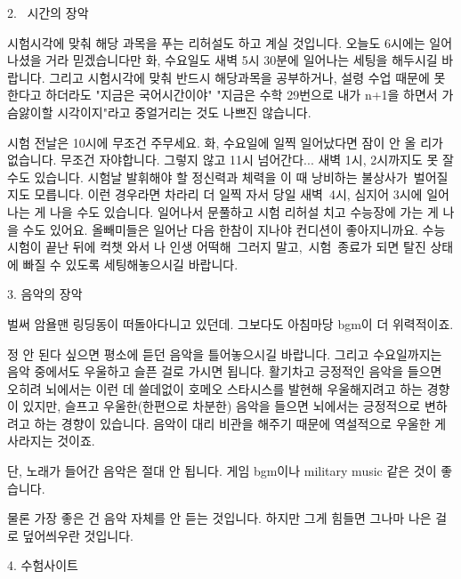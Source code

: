 \item 2.  시간의 장악
\vspace{5mm}

시험시각에 맞춰 해당 과목을 푸는 리허설도 하고 계실 것입니다.
오늘도 6시에는 일어나셨을 거라 믿겠습니다만 화, 수요일도 새벽 5시 30분에 일어나는 세팅을 해두시길 바랍니다.
그리고 시험시각에 맞춰 반드시 해당과목을 공부하거나, 설령 수업 때문에 못 한다고 하더라도 "지금은 국어시간이야"
"지금은 수학 29번으로 내가 n+1을 하면서 가슴앓이할 시각이지"라고 중얼거리는 것도 나쁘진 않습니다.
\vspace{5mm}

시험 전날은 10시에 무조건 주무세요. 화, 수요일에 일찍 일어났다면 잠이 안 올 리가 없습니다.
무조건 자야합니다. 그렇지 않고 11시 넘어간다... 새벽 1시, 2시까지도 못 잘 수도 있습니다.
시험날 발휘해야 할 정신력과 체력을 이 때 낭비하는 불상사가 벌어질지도 모릅니다.
이런 경우라면 차라리 더 일찍 자서 당일 새벽 4시, 심지어 3시에 일어나는 게 나을 수도 있습니다.
일어나서 문풀하고 시험 리허설 치고 수능장에 가는 게 나을 수도 있어요. 올빼미들은 일어난 다음 한참이 지나야 컨디션이 좋아지니까요.
수능시험이 끝난 뒤에 컥챗 와서 나 인생 어떡해 그러지 말고, 시험 종료가 되면 탈진 상태에 빠질 수 있도록 세팅해놓으시길 바랍니다.
\vspace{5mm}

\item 3. 음악의 장악
\vspace{5mm}

벌써 암욜맨 링딩동이 떠돌아다니고 있던데. 그보다도 아침마당 bgm이 더 위력적이죠.
\vspace{5mm}

정 안 된다 싶으면 평소에 듣던 음악을 틀어놓으시길 바랍니다.
그리고 수요일까지는 음악 중에서도 우울하고 슬픈 걸로 가시면 됩니다.
활기차고 긍정적인 음악을 들으면 오히려 뇌에서는 이런 데 쓸데없이 호메오 스타시스를 발현해 우울해지려고 하는 경향이 있지만,
슬프고 우울한(한편으로 차분한) 음악을 들으면 뇌에서는 긍정적으로 변하려고 하는 경향이 있습니다.
음악이 대리 비관을 해주기 때문에 역설적으로 우울한 게 사라지는 것이죠.
\vspace{5mm}

단, 노래가 들어간 음악은 절대 안 됩니다.
게임 bgm이나 military music 같은 것이 좋습니다.
\vspace{5mm}

물론 가장 좋은 건 음악 자체를 안 듣는 것입니다. 하지만 그게 힘들면 그나마 나은 걸로 덮어씌우란 것입니다.
\vspace{5mm}

\item 4. 수험사이트
\vspace{5mm}

